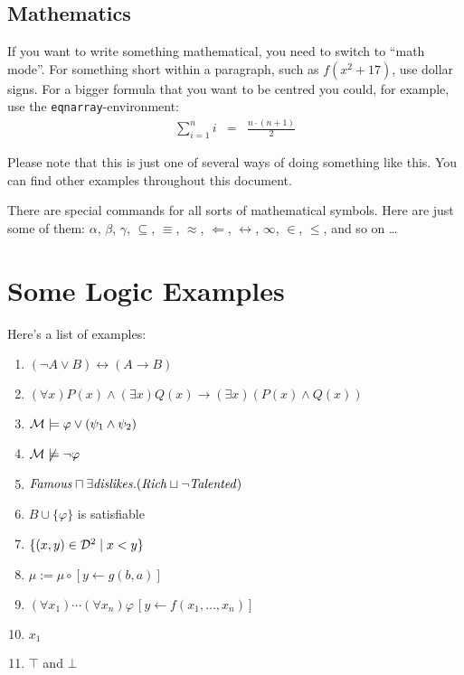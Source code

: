\documentclass[11pt]{article}
\begin{document}
\subsection{Mathematics}

If you want to write something mathematical, you need to switch to ``math mode''.
For something short within a paragraph, such as $f(x^2 + 17)$, use dollar signs. 
For a bigger formula that you want to be centred you could, for example, use the
\texttt{eqnarray}-environment:
\begin{eqnarray}
\sum_{i=1}^n i & = & \frac{n \cdot (n+1)}{2}
\end{eqnarray}

Please note that this is just one of several ways of doing something like this.
You can find other examples throughout this document.

There are special commands for all sorts of mathematical symbols. Here are just
some of them: $\alpha$, $\beta$, $\gamma$, $\subseteq$, $\equiv$, $\approx$,
$\Leftarrow$, $\leftrightarrow$, $\infty$, $\in$, $\leq$, and so on \ldots 


\section{Some Logic Examples}\label{logicexamples}

Here's a list of examples:
\begin{enumerate}
\item $(\neg A \vee B) \leftrightarrow (A \rightarrow B)$
\item $(\forall x) P(x) \wedge (\exists x) Q(x) \rightarrow 
  (\exists x)(P(x) \wedge Q(x))$
\item ${\cal M} \models \varphi \vee (\psi_1 \wedge \psi_2)$
\item ${\cal M} \not\models \neg \varphi$
\item
  $\mbox{\textit{Famous}} \sqcap
  \exists \mbox{\textit{dislikes}}.(\mbox{\textit{Rich}} \sqcup
  \neg \mbox{\textit{Talented}})$
\item $B \cup \{\varphi\}$ is satisfiable
\item $\{(x,y) \in {\cal D}^2 \;|\; x < y\}$
\item $\mu := \mu \circ [y\leftarrow g(b,a)]$
\item $(\forall x_1)\cdots(\forall x_n)\varphi\,[y\leftarrow f(x_1,\ldots,x_n)]$
\item $x_1$
\item $\top$ and $\bot$
\end{enumerate}
\end{document}
